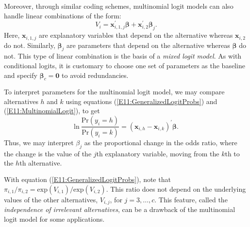 
Moreover, through similar coding schemes, multinomial logit models
can also handle linear combinations of the form:
\begin{equation*}
V_i = \mathbf{x}_{i,1,j}^{\prime} \boldsymbol \beta +
\mathbf{x}_{i,2}^{\prime} \boldsymbol \beta_j .
\end{equation*}
Here, $\mathbf{x}_{i,1,j}$ are explanatory variables that depend on
the alternative whereas $\mathbf{x}_{i,2}$ do not. Similarly,
$\boldsymbol \beta_j$ are parameters that depend on the alternative
whereas $\boldsymbol \beta$ do not. This type of linear combination
is the basis of a \emph{mixed logit model}. As with conditional
logits, it is customary to choose one set of parameters as the
baseline and specify $\boldsymbol \beta_c = \mathbf{0}$ to avoid
redundancies.

To interpret parameters for the multinomial logit model, we may
compare alternatives $h$ and $k$ using equations
(\ref{E11:GeneralizedLogitProbs}) and (\ref{E11:MultinomialLogit}),
to get
\begin{equation*}
\mathrm{ln}~ \frac{\mathrm{Pr} \left(y_i = h \right)} {\mathrm{Pr}
\left(y_i = k \right)} = (\mathbf{x}_{i,h}-\mathbf{x}_{i,k})
^{\prime} \boldsymbol \beta  .
\end{equation*}
Thus, we may interpret $\beta_j$ as the proportional change in the
odds ratio, where the change is the value of the $j$th explanatory
variable, moving from the $k$th to the $h$th alternative.

With equation (\ref{E11:GeneralizedLogitProbs}), note that
$\pi_{i,1} / \pi_{i,2} = \mathrm{exp}(V_{i,1})
/\mathrm{exp}(V_{i,2})$. This ratio does not depend on the
underlying values of the other alternatives, $V_{i,j}$, for $j=3,
\ldots, c$. This feature, called the \emph{independence of
irrelevant alternatives}, can be a drawback of the multinomial logit
model for some applications.

\linejed{}

